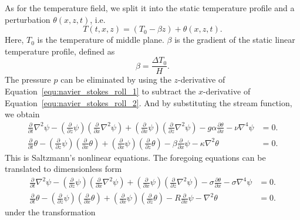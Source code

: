 As for the temperature field, we split it into the static temperature profile and a perturbation \(\theta\left(x,z,t\right)\), i.e.
\begin{equation}
	T\left( t,x,z \right)=\left( T_0-\beta z \right)+\theta\left(x,z,t\right).
	\label{equ:temperature_expansion}
\end{equation}
Here, \(T_0\) is the temperature of middle plane. \(\beta\) is the gradient of the static linear temperature profile, defined as
\begin{equation}
	\beta=\frac{\Delta T_0}{H}.
	\label{equ:temperature_gradient}
\end{equation}
The pressure \(p\) can be eliminated by using the \(z\)-derivative of Equation~\ref{equ:navier_stokes_roll_1} to subtract the \(x\)-derivative of Equation~\ref{equ:navier_stokes_roll_2}. And by substituting the stream function, we obtain
\begin{align}
	\frac{\partial}{\partial t}\nabla^2\psi-\left(\frac{\partial}{\partial z}\psi\right)\left(\frac{\partial}{\partial x}\nabla^2\psi\right)+\left(\frac{\partial}{\partial x}\psi\right)\left(\frac{\partial}{\partial z}\nabla^2\psi\right)-g\alpha\frac{\partial\theta}{\partial x}-\nu\nabla^4\psi&=0.\label{equ:stream_equation}\\
	\frac{\partial}{\partial t}\theta-\left(\frac{\partial}{\partial z}\psi\right)\left( \frac{\partial}{\partial x}\theta \right)+\left(\frac{\partial}{\partial x}\psi\right)\left( \frac{\partial}{\partial z}\theta \right)-\beta\frac{\partial}{\partial x}\psi-\kappa\nabla^2\theta&=0.\label{equ:thermal_equation}
\end{align}
This is Saltzmann's nonlinear equations. The foregoing equations can be translated to dimensionless form
\begin{align}
	\frac{\partial}{\partial t}\nabla^2\psi-\left(\frac{\partial}{\partial z}\psi\right)\left(\frac{\partial}{\partial x}\nabla^2\psi\right)+\left(\frac{\partial}{\partial x}\psi\right)\left(\frac{\partial}{\partial z}\nabla^2\psi\right)-\sigma\frac{\partial\theta}{\partial x}-\sigma\nabla^4\psi&=0.\label{equ:stream_equation_dimensionless}\\
	\frac{\partial}{\partial t}\theta-\left(\frac{\partial}{\partial z}\psi\right)\left( \frac{\partial}{\partial x}\theta \right)+\left(\frac{\partial}{\partial x}\psi\right)\left( \frac{\partial}{\partial z}\theta \right)-R\frac{\partial}{\partial x}\psi-\nabla^2\theta&=0.\label{equ:thermal_equation_dimensionless}
\end{align}
under the transformation
